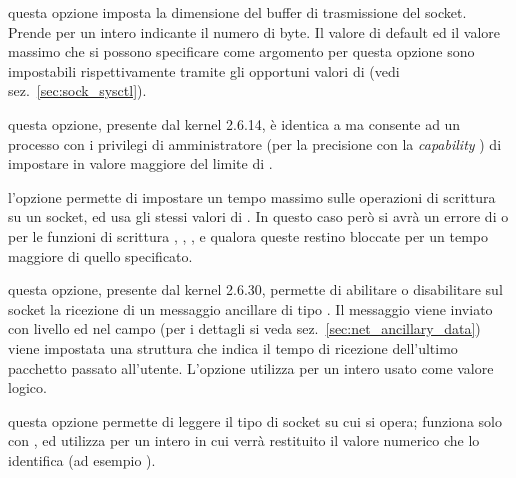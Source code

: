\begin{basedescript}{\desclabelwidth{2.2cm}\desclabelstyle{\nextlinelabel}}
\item[\constd{SO\_SNDBUF}] questa opzione imposta la dimensione del buffer di
  trasmissione del socket. Prende per  un intero indicante il
  numero di byte. Il valore di default ed il valore massimo che si possono
  specificare come argomento per questa opzione sono impostabili
  rispettivamente tramite gli opportuni valori di  (vedi
  sez.~\ref{sec:sock_sysctl}).

\item[\constd{SO\_SNDBUFFORCE}] questa opzione, presente dal kernel 2.6.14, è
  identica a  ma consente ad un processo con i privilegi di
  amministratore (per la precisione con la \textit{capability}
  ) di impostare in valore maggiore del limite di
  .


\item[\constd{SO\_SNDTIMEO}] l'opzione permette di impostare un tempo massimo
  sulle operazioni di scrittura su un socket, ed usa gli stessi valori di
  .  In questo caso però si avrà un errore di
   o  per le funzioni di scrittura
  , , ,  e 
  qualora queste restino bloccate per un tempo maggiore di quello specificato. 

\item[\constd{SO\_TIMESTAMP}] questa opzione, presente dal kernel 2.6.30,
  permette di abilitare o disabilitare sul socket la ricezione di un messaggio
  ancillare di tipo . Il messaggio viene inviato con
  livello  ed nel campo  (per i dettagli si
  veda sez.~\ref{sec:net_ancillary_data}) viene impostata una struttura
   che indica il tempo di ricezione dell'ultimo pacchetto
  passato all'utente.  L'opzione utilizza per  un intero usato
  come valore logico.


\item[\constd{SO\_TYPE}] questa opzione permette di leggere il tipo di socket
  su cui si opera; funziona solo con , ed utilizza per
   un intero in cui verrà restituito il valore numerico che lo
  identifica (ad esempio ). 


\end{basedescript}


